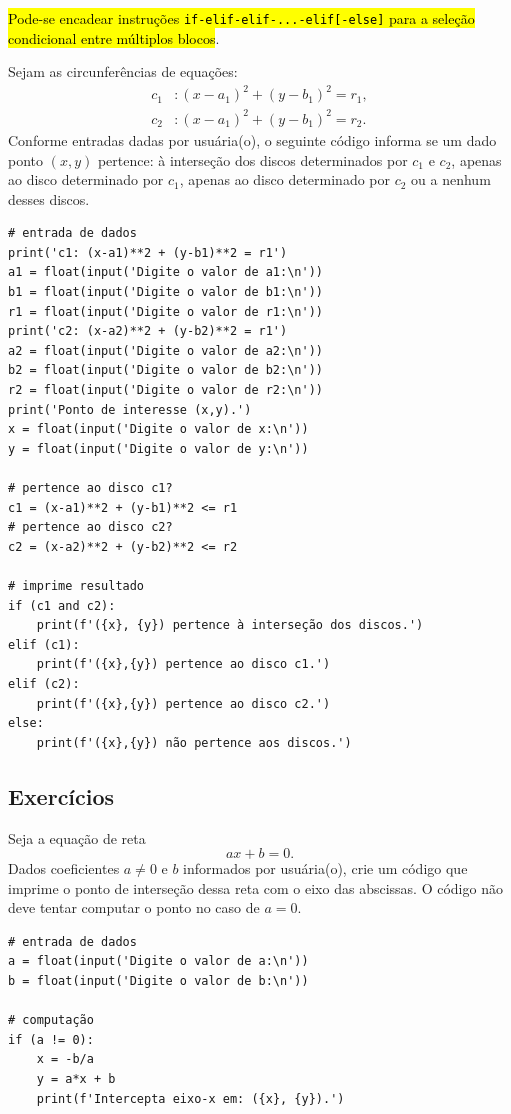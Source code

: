 \hl{Pode-se encadear instruções \texttt{if-elif-elif-...-elif[-else]} para a seleção condicional entre múltiplos blocos}.

\begin{ex}
  Sejam as circunferências de equações:
  \begin{align}
    c_1&: (x-a_1)^2 + (y-b_1)^2 = r_1,\\
    c_2&: (x-a_1)^2 + (y-b_1)^2 = r_2.
  \end{align}
  Conforme entradas dadas por usuária(o), o seguinte código informa se um dado ponto $(x, y)$ pertence: à interseção dos discos determinados por $c_1$ e $c_2$, apenas ao disco determinado por $c_1$, apenas ao disco determinado por $c_2$ ou a nenhum desses discos.

\begin{lstlisting}
# entrada de dados
print('c1: (x-a1)**2 + (y-b1)**2 = r1')
a1 = float(input('Digite o valor de a1:\n'))
b1 = float(input('Digite o valor de b1:\n'))
r1 = float(input('Digite o valor de r1:\n'))
print('c2: (x-a2)**2 + (y-b2)**2 = r1')
a2 = float(input('Digite o valor de a2:\n'))
b2 = float(input('Digite o valor de b2:\n'))
r2 = float(input('Digite o valor de r2:\n'))
print('Ponto de interesse (x,y).')
x = float(input('Digite o valor de x:\n'))
y = float(input('Digite o valor de y:\n'))

# pertence ao disco c1?
c1 = (x-a1)**2 + (y-b1)**2 <= r1
# pertence ao disco c2?
c2 = (x-a2)**2 + (y-b2)**2 <= r2

# imprime resultado
if (c1 and c2):
    print(f'({x}, {y}) pertence à interseção dos discos.')
elif (c1):
    print(f'({x},{y}) pertence ao disco c1.')
elif (c2):
    print(f'({x},{y}) pertence ao disco c2.')
else:
    print(f'({x},{y}) não pertence aos discos.')
\end{lstlisting}

\end{ex}


\subsection{Exercícios}

\begin{exer}
  Seja a equação de reta
  \begin{equation}
    ax + b = 0.
  \end{equation}
  Dados coeficientes $a \neq 0$ e $b$ informados por usuária(o), crie um código que imprime o ponto de interseção dessa reta com o eixo das abscissas. O código não deve tentar computar o ponto no caso de $a=0$. 
\end{exer}
\begin{resp}

\begin{lstlisting}
# entrada de dados
a = float(input('Digite o valor de a:\n'))
b = float(input('Digite o valor de b:\n'))

# computação
if (a != 0):
    x = -b/a
    y = a*x + b
    print(f'Intercepta eixo-x em: ({x}, {y}).')
\end{lstlisting}

\end{resp}

